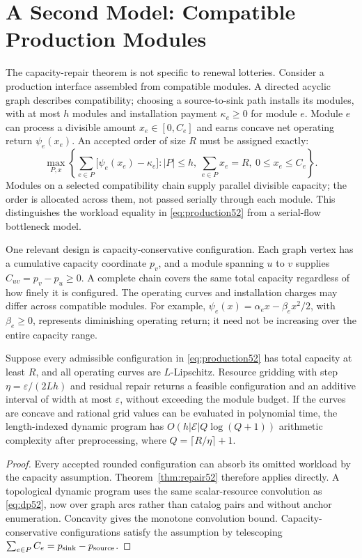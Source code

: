 \section{A Second Model: Compatible Production Modules}\label{sec:production52}
The capacity-repair theorem is not specific to renewal lotteries. Consider a production interface assembled from compatible modules. A directed acyclic graph describes compatibility; choosing a source-to-sink path installs its modules, with at most $h$ modules and installation payment $\kappa_e\geq0$ for module $e$. Module $e$ can process a divisible amount $x_e\in[0,C_e]$ and earns concave net operating return $\psi_e(x_e)$. An accepted order of size $R$ must be assigned exactly:
\begin{equation}\label{eq:production52}
 \max_{P,x}\left\{\sum_{e\in P}\bigl[\psi_e(x_e)-\kappa_e\bigr]:
 |P|\leq h,\ \sum_{e\in P}x_e=R,\ 0\leq x_e\leq C_e\right\}.
\end{equation}
Modules on a selected compatibility chain supply parallel divisible capacity; the order is allocated across them, not passed serially through each module. This distinguishes the workload equality in \eqref{eq:production52} from a serial-flow bottleneck model.

One relevant design is capacity-conservative configuration. Each graph vertex has a cumulative capacity coordinate $p_v$, and a module spanning $u$ to $v$ supplies $C_{uv}=p_v-p_u\geq0$. A complete chain covers the same total capacity regardless of how finely it is configured. The operating curves and installation charges may differ across compatible modules. For example, $\psi_e(x)=\alpha_ex-\beta_ex^2/2$, with $\beta_e\geq0$, represents diminishing operating return; it need not be increasing over the entire capacity range.

\begin{corollary}\label{cor:production52}
Suppose every admissible configuration in \eqref{eq:production52} has total capacity at least $R$, and all operating curves are $L$-Lipschitz. Resource gridding with step $\eta=\varepsilon/(2Lh)$ and residual repair returns a feasible configuration and an additive interval of width at most $\varepsilon$, without exceeding the module budget. If the curves are concave and rational grid values can be evaluated in polynomial time, the length-indexed dynamic program has $O(h|\mathcal E|Q\log(Q+1))$ arithmetic complexity after preprocessing, where $Q=\lceil R/\eta\rceil+1$.
\end{corollary}
\begin{proof}
Every accepted rounded configuration can absorb its omitted workload by the capacity assumption. Theorem~\ref{thm:repair52} therefore applies directly. A topological dynamic program uses the same scalar-resource convolution as \eqref{eq:dp52}, now over graph arcs rather than catalog pairs and without anchor enumeration. Concavity gives the monotone convolution bound. Capacity-conservative configurations satisfy the assumption by telescoping $\sum_{e\in P}C_e=p_{\rm sink}-p_{\rm source}$.
\end{proof}

